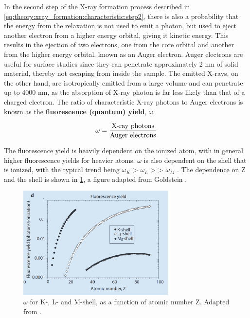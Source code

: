 In the second step of the X-ray formation process described in \cref{eq:theory:xray_formation:characteristic:step2}, there is also a probability that the energy from the relaxation is not used to emit a photon, but used to eject another electron from a higher energy orbital, giving it kinetic energy.
This results in the ejection of two electrons, one from the core orbital and another from the higher energy orbital, known as an Auger electron.
Auger electrons are useful for surface studies since they can penetrate approximately 2 nm of solid material, thereby not escaping from inside the sample.
The emitted X-rays, on the other hand, are isotropically emitted from a large volume and can penetrate up to 4000 nm, as the absorption of X-ray photon is far less likely than that of a charged electron. %
The ratio of characteristic X-ray photons to Auger electrons is known as the \textbf{fluorescence (quantum) yield}, $\omega$.

\begin{equation}
    \label{eq:theory:theoreticalxray:yield}
    \omega = \frac{\textnormal{X-ray photons}}{\textnormal{Auger electrons}}
\end{equation}

The fluorescence yield is heavily dependent on the ionized atom, with in general higher fluorescence yields for heavier atoms.
$\omega$ is also dependent on the shell that is ionized, with the typical trend being $\omega_K$ > $\omega_L$ > > $\omega_M$ \cite[p. 267]{goldstein_scanning_2018}.
The dependence on Z and the shell is shown in \cref{fig:theory:fluorescence_yield}, a figure adapted from Goldstein \cite[Fig. 4.3 (d)]{goldstein_scanning_2018}.

\begin{figure}[ht]
    \centering
    \includegraphics[width=0.7\textwidth]{figures/fluorescence_yield_Goldstein_Fig4-3-d.png}
    \caption{
        $\omega$ for K-, L- and M-shell, as a function of atomic number Z.
        Adapted from \cite[Fig. 4.3 (d)]{goldstein_scanning_2018}.
    }
    \label{fig:theory:fluorescence_yield}
\end{figure}








